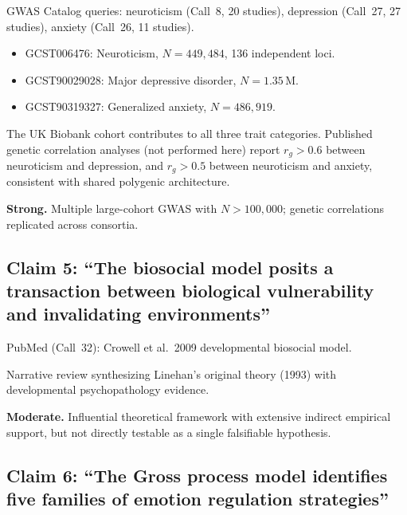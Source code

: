 \begin{description}[style=nextline, nosep]
  \item[Evidence source]
    GWAS Catalog queries: neuroticism (Call~8, 20 studies), depression
    (Call~27, 27 studies), anxiety (Call~26, 11 studies).
  \item[Key studies]
    \begin{itemize}[nosep]
      \item GCST006476: Neuroticism, $N = 449{,}484$, 136 independent loci.
      \item GCST90029028: Major depressive disorder, $N = 1.35$\,M.
      \item GCST90319327: Generalized anxiety, $N = 486{,}919$.
    \end{itemize}
  \item[Overlap observation]
    The UK Biobank cohort contributes to all three trait categories.
    Published genetic correlation analyses (not performed here) report
    $r_g > 0.6$ between neuroticism and depression, and $r_g > 0.5$ between
    neuroticism and anxiety, consistent with shared polygenic architecture.
  \item[Grade] \textbf{Strong.}  Multiple large-cohort GWAS with
    $N > 100{,}000$; genetic correlations replicated across consortia.
\end{description}

\subsection*{Claim 5: ``The biosocial model posits a transaction between
biological vulnerability and invalidating environments''}

\begin{description}[style=nextline, nosep]
  \item[Evidence source]
    PubMed (Call~32): Crowell et al.\ 2009 developmental biosocial model.
  \item[Design]
    Narrative review synthesizing Linehan's original theory (1993) with
    developmental psychopathology evidence.
  \item[Grade] \textbf{Moderate.}  Influential theoretical framework with
    extensive indirect empirical support, but not directly testable as a
    single falsifiable hypothesis.
\end{description}

\subsection*{Claim 6: ``The Gross process model identifies five families
of emotion regulation strategies''}

